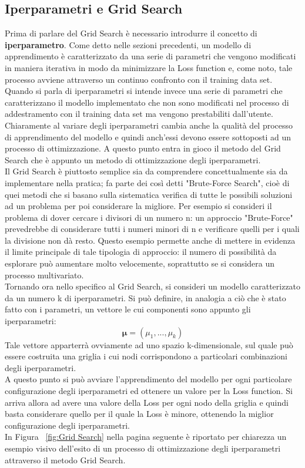 \newpage

\subsection{Iperparametri e Grid Search}
\label{iperparametri e grid search}

Prima di parlare del Grid Search è necessario introdurre il concetto di \textbf{iperparametro}. Come detto nelle sezioni precedenti, un modello di apprendimento è caratterizzato da una serie di parametri che vengono modificati in maniera iterativa in modo da minimizzare la Loss function e, come noto, tale processo avviene attraverso un continuo confronto con il training data set. Quando si parla di iperparametri si intende invece una serie di parametri che caratterizzano il modello implementato che non sono modificati nel processo di addestramento con il training data set ma vengono prestabiliti dall'utente. \\
Chiaramente al variare degli iperparametri cambia anche la qualità del processo di apprendimento del modello e quindi anch'essi devono essere sottoposti ad un processo di ottimizzazione. A questo punto entra in gioco il metodo del Grid Search che è appunto un metodo di ottimizzazione degli iperparametri. \\
Il Grid Search è piuttosto semplice sia da comprendere concettualmente sia da implementare nella pratica; fa parte dei così detti "Brute-Force Search", cioè di quei metodi che si basano sulla sistematica verifica di tutte le possibili soluzioni ad un problema per poi considerare la migliore. Per esempio si consideri il problema di dover cercare i divisori di un numero n: un approccio "Brute-Force" prevedrebbe di considerare tutti i numeri minori di n e verificare quelli per i quali la divisione non dà resto. Questo esempio permette anche di mettere in evidenza il limite principale di tale tipologia di approccio: il numero di possibilità da esplorare può aumentare molto velocemente, soprattutto se si considera un processo multivariato. \\
Tornando ora nello specifico al Grid Search, si consideri un modello caratterizzato da un numero k di iperparametri. Si può definire, in analogia a ciò che è stato fatto con i parametri, un vettore le cui componenti sono appunto gli iperparametri: 
\begin{equation}
\bm{\mu} = (\mu_1,...,\mu_k)
\end{equation}
Tale vettore apparterrà ovviamente ad uno spazio k-dimensionale, sul quale può essere costruita una griglia i cui nodi corrispondono a particolari combinazioni degli iperparametri. \\
A questo punto si può avviare l'apprendimento del modello per ogni particolare configurazione degli iperparametri ed ottenere un valore per la Loss function. Si arriva allora ad avere una valore della Loss per ogni nodo della griglia e quindi basta considerare quello per il quale la Loss è minore, ottenendo la miglior configurazione degli iperparametri. \\
In Figura ~\ref{fig:Grid Search} nella pagina seguente è riportato per chiarezza un esempio visivo dell'esito di un processo di ottimizzazione degli iperparametri attraverso il metodo Grid Search.

